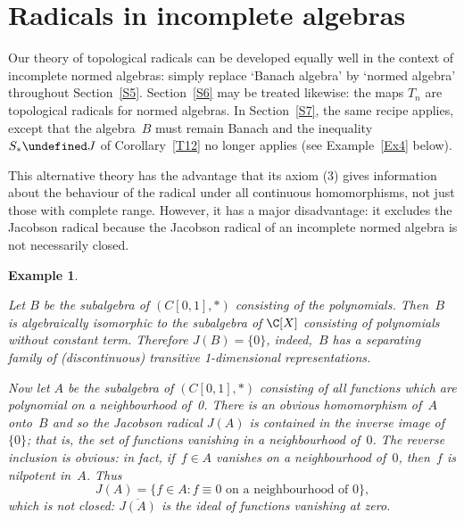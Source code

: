 \documentclass[11pt]{article}
\let\leq\undefined  \let\geq\undefined
\let\le\leq   \let\ge\geq
\newcommand{\closure}[1]{\overline{#1}}
\newcommand{\e}{\varepsilon}
\newtheorem{example}[thm]{Example}
\newenvironment{Example}{\begin{example}\begin{rm}}{\end{rm}\end{example}}
\newcommand{\detail}[1]{}
\begin{document}
\section{Radicals in incomplete algebras}\label{S10}

Our theory of topological radicals can be developed equally well in
the context of incomplete normed algebras: simply replace `Banach algebra' by
`normed algebra' throughout Section~\ref{S5}.   Section~\ref{S6} may be treated
likewise: the maps $T_n$ are topological radicals for normed algebras.  In
Section~\ref{S7}, the same recipe applies,  except that the algebra~$B$ must
remain Banach and the inequality $S_* \le J$ of Corollary~\ref{T12} no longer
applies (see Example~\ref{Ex4} below).

This alternative theory has the advantage that its axiom (3) gives information
about the behaviour of the radical under all continuous homomorphisms, not just
those with complete range.    However, it has a major disadvantage: it excludes
the Jacobson radical because the Jacobson radical of an incomplete normed
algebra is not necessarily closed.

\begin{Example}\label{Ex3}
Let $B$ be the subalgebra of $(C[0,1],*)$ consisting of the polynomials.
Then~$B$ is algebraically isomorphic to the subalgebra of $\C[X]$
consisting of polynomials without constant term.   Therefore
$J(B) = \{0\}$, indeed,~$B$ has a separating family of
(discontinuous) transitive 1-dimensional representations.

Now let $A$ be the subalgebra of $(C[0,1],*)$ consisting of all functions
which are polynomial on a neighbourhood of~0.   There is an obvious
homomorphism of~$A$ onto~$B$ and so the Jacobson radical $J(A)$ is
contained in the inverse image of $\{0\}$; that is, the set of functions
vanishing in a neighbourhood of~$0$.  The reverse inclusion is
obvious: in fact, if~$f \in A$ vanishes on a neighbourhood of~$0$,
then~$f$ is nilpotent in~$A$.  Thus
$$J(A) = \{f \in A: f \equiv 0 \mbox{ on a neighbourhood of }0\},$$
which is not closed: $\closure{J(A)}$ is the ideal of functions
vanishing at zero.

\detail{Alternatively: if $f(x) = p(x)$ $(0 \le x \le \delta)$ for some
non-zero polynomial~$p$ and some $\delta > 0$, then $f$ cannot be
quasi-regular, for if~$g$ were a quasi-inverse for~$f$ in~$A$ then
$g(x) = q(x)$ $(0 \le q(x) \le \e)$ for some polynomial~$q$ and some
$\e > 0$.  But if
$$p(x) = a_nx^n + \mbox{ lower order terms}$$
and
$$q(x) = b_mx^m + \mbox{ lower order terms},$$
then
$$p(x) + q(x) + (p*q)(x) = a_nb_m(x^n*x^m) + \mbox{ lower order terms}$$
and $x^n*x^m$ is a non-zero multiple of $x^{n+m+1}$.  Hence
$p + q + p*q \ne 0$; contradiction.}%
\end{Example}
\end{document}
